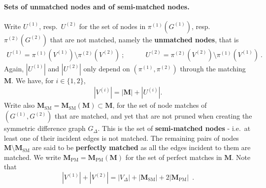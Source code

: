 \documentclass[final]{colt2026}
\newcommand{\1}{\mathbf{1}}
\begin{document}
\paragraph{Sets of unmatched nodes and of semi-matched nodes.} 
 Write $U^{(1)}$, resp.~$U^{(2)}$ for the set of nodes in $\pi^{(1)}(G^{(1)})$, resp.~$\pi^{(2)}(G^{(2)})$ that are not matched, namely the {\bf unmatched nodes}, that is 
\begin{align*}
U^{(1)} =\pi^{(1)}(V^{(1)})\setminus \pi^{(2)}(V^{(2)})\ ; \quad \quad\quad 
U^{(2)} =\pi^{(2)}(V^{(2)})\setminus \pi^{(1)}(V^{(1)})\ . 
\end{align*}
Again, $|U^{(1)}|$ and $|U^{(2)}|$ only  depend on $(\pi^{(1)},\pi^{(2)})$ through the matching $\mathbf{M}$. 
We have, for $i\in \{1,2\}$,
\begin{align}\label{eq:unmatched}
    |V^{(i)}| = |\mathbf M| + |U^{(i)}|.
\end{align}
Write also $\mathbf M_{\mathrm{SM}} = \mathbf M_{\mathrm{SM}}(\mathbf M) \subset \mathbf M$, 
for the set of node matches of $(G^{(1)},G^{(2)})$ that are matched, and yet that are not pruned when creating the symmetric difference graph $G_{\Delta}$.
This is the set of {\bf semi-matched nodes} - i.e.~at least one of their incident edges is not matched.  The remaining pairs of nodes $\mathbf M \setminus \mathbf M_{\mathrm{SM}}$ are said to be {\bf perfectly matched} as all the edges incident to them are matched. We write  $\mathbf M_{\mathrm{PM}} = \mathbf M_{\mathrm{PM}}(\mathbf M)$ for the set of perfect matches in $\mathbf M$. Note that 
\begin{equation}\label{eq:PMSM}
     |V^{(1)}| +|V^{(2)}| =   |V_{\Delta}| + |\mathbf M_{\mathrm{SM}}| + 2|\mathbf M_{\mathrm{PM}}|\enspace  .
\end{equation} 
\end{document}
